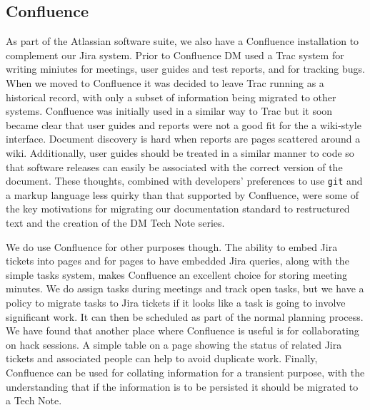 \subsection{Confluence}

As part of the Atlassian software suite, we also have a Confluence installation to complement our Jira system.
Prior to Confluence DM used a Trac system for writing miniutes for meetings, user guides and test reports, and for tracking bugs.
When we moved to Confluence it was decided to leave Trac running as a historical record, with only a subset of information being migrated to other systems.
Confluence was initially used in a similar way to Trac but it soon became clear that user guides and reports were not a good fit for the a wiki-style interface.
Document discovery is hard when reports are pages scattered around a wiki.
Additionally, user guides should be treated in a similar manner to code so that software releases can easily be associated with the correct version of the document.
These thoughts, combined with developers' preferences to use \texttt{git} and a markup language less quirky than that supported by Confluence, were some of the key motivations for migrating our documentation standard to restructured text and the creation of the DM Tech Note series.

We do use Confluence for other purposes though.
The ability to embed Jira tickets into pages and for pages to have embedded Jira queries, along with the simple tasks system, makes Confluence an excellent choice for storing meeting minutes.
We do assign tasks during meetings and track open tasks, but we have a policy to migrate tasks to Jira tickets if it looks like a task is going to involve significant work.
It can then be scheduled as part of the normal planning process.
We have found that another place where Confluence is useful is for collaborating on hack sessions.
A simple table on a page showing the status of related Jira tickets and associated people can help to avoid duplicate work.
Finally, Confluence can be used for collating information for a transient purpose, with the understanding that if the information is to be persisted it should be migrated to a Tech Note.
